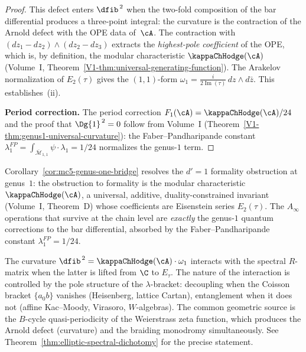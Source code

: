 \begin{proof}
This defect enters $\dfib^{\,2}$ when the two-fold composition of
the bar differential produces a three-point integral: the curvature
is the contraction of the Arnold defect with the OPE data of~$\cA$.
The contraction with $(dz_1 - dz_2) \wedge (dz_2 - dz_3)$ extracts
the \emph{highest-pole coefficient} of the OPE, which is, by
definition, the modular characteristic $\kappaChHodge(\cA)$
(Volume~I, Theorem~\ref*{V1-thm:universal-generating-function}).
The Arakelov normalization of $E_2(\tau)$ gives the $(1,1)$-form
$\omega_1 = \frac{i}{2\operatorname{Im}(\tau)}\,dz \wedge d\bar{z}$.
This establishes~(ii).

\textbf{Period correction.}
The period correction $F_1(\cA) = \kappaChHodge(\cA)/24$ and the proof
that $\Dg{1}^{\,2} = 0$ follow from Volume~I
(Theorem~\ref*{V1-thm:genus1-universal-curvature}): the
Faber--Pandharipande constant
$\lambda_1^{FP} = \int_{\overline{\mathcal{M}}_{1,1}} \psi \cdot
\lambda_1 = 1/24$ normalizes the genus-$1$ term.
\end{proof}

\begin{remark}
Corollary~\ref{cor:mc5-genus-one-bridge} resolves the $d' = 1$
formality obstruction at genus~$1$: the obstruction to
formality is the modular
characteristic $\kappaChHodge(\cA)$, a universal, additive,
duality-constrained invariant (Volume~I, Theorem~D) whose
coefficients are Eisenstein series $E_2(\tau)$.
The $A_\infty$ operations that survive at the chain level are
\emph{exactly} the genus-$1$ quantum corrections to the bar
differential, absorbed by the Faber--Pandharipande constant
$\lambda_1^{FP} = 1/24$.
\end{remark}

\begin{remark}
The curvature $\dfib^{\,2} = \kappaChHodge(\cA)\cdot\omega_1$ interacts
with the spectral $R$-matrix when the latter is lifted from
$\C$ to $E_\tau$. The nature of the interaction is controlled by
the pole structure of the $\lambda$-bracket: decoupling when the
Coisson bracket $\{a{}_0 b\}$ vanishes (Heisenberg, lattice
Cartan), entanglement when it does not (affine Kac--Moody,
Virasoro, $W$-algebras). The common geometric source is the
$B$-cycle quasi-periodicity of the Weierstrass zeta function, which
produces the Arnold defect (curvature) and the braiding monodromy
simultaneously.
See Theorem~\ref{thm:elliptic-spectral-dichotomy} for the precise
statement.
\end{remark}

